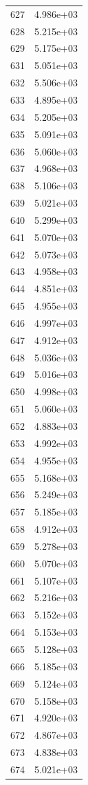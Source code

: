 \documentclass[12pt]{article}
\begin{document}
\begin{longtable}{@{}cc@{}}
627 & 4.986e+03 \\
628 & 5.215e+03 \\
629 & 5.175e+03 \\
631 & 5.051e+03 \\
632 & 5.506e+03 \\
633 & 4.895e+03 \\
634 & 5.205e+03 \\
635 & 5.091e+03 \\
636 & 5.060e+03 \\
637 & 4.968e+03 \\
638 & 5.106e+03 \\
639 & 5.021e+03 \\
640 & 5.299e+03 \\
641 & 5.070e+03 \\
642 & 5.073e+03 \\
643 & 4.958e+03 \\
644 & 4.851e+03 \\
645 & 4.955e+03 \\
646 & 4.997e+03 \\
647 & 4.912e+03 \\
648 & 5.036e+03 \\
649 & 5.016e+03 \\
650 & 4.998e+03 \\
651 & 5.060e+03 \\
652 & 4.883e+03 \\
653 & 4.992e+03 \\
654 & 4.955e+03 \\
655 & 5.168e+03 \\
656 & 5.249e+03 \\
657 & 5.185e+03 \\
658 & 4.912e+03 \\
659 & 5.278e+03 \\
660 & 5.070e+03 \\
661 & 5.107e+03 \\
662 & 5.216e+03 \\
663 & 5.152e+03 \\
664 & 5.153e+03 \\
665 & 5.128e+03 \\
666 & 5.185e+03 \\
669 & 5.124e+03 \\
670 & 5.158e+03 \\
671 & 4.920e+03 \\
672 & 4.867e+03 \\
673 & 4.838e+03 \\
674 & 5.021e+03 \\

\end{longtable}
\end{document}
